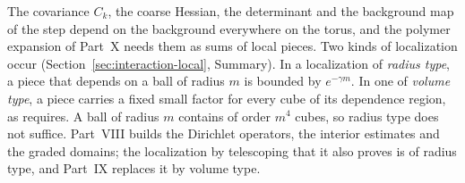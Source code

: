 \label{intro:VIII}
The covariance $C_k$, the coarse Hessian, the determinant and the background map of the step depend on the background everywhere on the torus, and the polymer expansion of Part~X needs them as sums of local pieces. Two kinds of localization occur (Section~\ref{sec:interaction-local}, Summary). In a localization of \emph{radius type}, a piece that depends on a ball of radius $m$ is bounded by $e^{-\gamma m}$. In one of \emph{volume type}, a piece carries a fixed small factor for every cube of its dependence region, as \cite[(116)--(122)]{DimockI} requires. A ball of radius $m$ contains of order $m^4$ cubes, so radius type does not suffice. Part~VIII builds the Dirichlet operators, the interior estimates and the graded domains; the localization by telescoping that it also proves is of radius type, and Part~IX replaces it by volume type.

